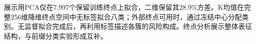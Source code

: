 展示用PCA仅在7,997个保留训练终点上拟合，二维保留其28.9\%方差。K均值在完整256维降维终点空间中无标签拟合八类；外部终点可用时，通过冻结中心分配类别。无监督拟合完成后，再利用标签描述各簇的风险构成。终点分析展示整体表征结构，与前缀分类实验形成互补。
